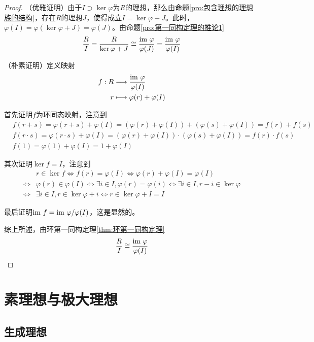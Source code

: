 \begin{proof}
	（优雅证明）由于$I\supset\ker\varphi$为$R$的理想，那么由命题\ref{pro:包含理想的理想族的结构}，存在$R$的理想$J$，使得成立$I=\ker\varphi+J$。此时，$\varphi(I)=\varphi(\ker\varphi+J)=\varphi(J)$。由命题\ref{pro:第一同构定理的推论1}
	$$
	\frac{R}{I}=\frac{R}{\ker\varphi+J}\cong\frac{\text{im } \varphi}{\varphi(J)}=\frac{\text{im } \varphi}{\varphi(I)}
	$$
	
	（朴素证明）定义映射
	\begin{align*}
		f:\begin{aligned}[t]
			R&\longrightarrow \frac{\text{im } \varphi}{\varphi(I)}\\
			r&\longmapsto \varphi(r)+\varphi(I)
		\end{aligned}
	\end{align*}
	
	首先证明$f$为环同态映射，注意到
	\begin{align*}
		&f(r+s)=\varphi(r+s)+\varphi(I)=(\varphi(r)+\varphi(I))+(\varphi(s)+\varphi(I))=f(r)+f(s)\\
		&f(r\cdot s)=\varphi(r\cdot s)+\varphi(I)=(\varphi(r)+\varphi(I))\cdot(\varphi(s)+\varphi(I))=f(r)\cdot f(s)\\
		&f(1)=\varphi(1)+\varphi(I)=1+\varphi(I)
	\end{align*}
	
	其次证明$\ker f=I$，注意到
	\begin{align*}
		&r\in\ker f
		\iff f(r)=\varphi(I)
		\iff \varphi(r)+\varphi(I)=\varphi(I)\\
		\iff &\varphi(r)\in\varphi(I)
		\iff \exists i\in I,\varphi(r)=\varphi(i)
		\iff \exists i\in I,r-i\in\ker\varphi\\
		\iff&\exists i\in I,r\in\ker\varphi+i
		\iff r\in\ker\varphi+I=I
	\end{align*}
	
	最后证明$\text{im } f=\text{im } \varphi/\varphi(I)$，这是显然的。
	
	综上所述，由环第一同构定理\ref{thm:环第一同构定理}
	$$
	\frac{R}{I}\cong\frac{\text{im } \varphi}{\varphi(I)}
	$$
\end{proof}

\section{素理想与极大理想}

\subsection{生成理想}

